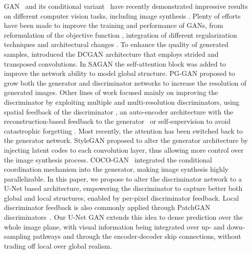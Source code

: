 \documentclass[10pt,twocolumn,letterpaper]{article}
\makeatletter
\renewcommand{\paragraph}{\@startsection{paragraph}{4}{\z@}{0.5ex plus 0.8ex minus .5ex}{-0.5em}{\normalsize\bf}}
\let\originalparagraph\paragraph
\renewcommand{\paragraph}[2][.]{\originalparagraph{#2#1}}
\makeatother
\begin{document}
\paragraph{Generative adversarial networks}

GAN~\cite{goodfellow2014generative} and its conditional variant~\cite{Mirza2014ConditionalGA} have recently demonstrated impressive results on different computer vision tasks, including image synthesis \cite{Radford2016UnsupervisedRL,Zhang_SAGAN19,karras2018progressive, Brock2019, Karras2018ASG, Lin2019COCOGANGB,Dey2018RankGANAM}. Plenty of efforts have been made to improve the training and performance of GANs, from reformulation of the objective function \cite{MaoLXLW16,Arjovsky2017WGAN,Lim2017GeometricG,Nowozin2016fGANTG}, integration of different regularization techniques \cite{Zhang2019ConsistencyRF,miyato2018spectral,Roth_NeurIPS2017,Zhang2018PAGANIG} and architectural changes \cite{Radford2016UnsupervisedRL,karras2018progressive,Durugkar2016GenerativeMN,Lin2019COCOGANGB}.
To enhance the quality of generated samples, \cite{Radford2016UnsupervisedRL} introduced the DCGAN architecture that employs strided and transposed convolutions. In SAGAN \cite{Zhang_SAGAN19} the self-attention block was added to improve the network ability to model global structure. PG-GAN \cite{karras2018progressive} proposed to grow both the generator and discriminator networks to increase the resolution of generated images. Other lines of work focused mainly on improving the discriminator by exploiting multiple \cite{Mordido2018DropoutGANLF, Durugkar2016GenerativeMN, Doan2018OnlineAC} and multi-resolution \cite{Wang2017HighResolutionIS,Sharma2018ImprovedTW} discriminators, using spatial feedback of the discriminator \cite{Huh2019FeedbackAL}, an auto-encoder architecture with the reconstruction-based feedback to the generator~\cite{zhao2016energy} or self-supervision to avoid catastrophic forgetting \cite{ChenSS2019}. 
Most recently, the attention has been switched back to the generator network. StyleGAN \cite{Karras2018ASG} proposed to alter the generator architecture by injecting latent codes to each convolution layer, thus allowing more control over the image synthesis process. COCO-GAN~\cite{Lin2019COCOGANGB} integrated the conditional coordination mechanism into the generator, making image synthesis highly parallelizable. 
In this paper, we propose to alter the discriminator network to a U-Net based architecture, empowering the discriminator to capture better both global and local structures, enabled by per-pixel discriminator feedback. 
Local discriminator feedback is also commonly applied through PatchGAN discriminators~\cite{isola2017image}. Our U-Net GAN extends this idea to dense prediction over the whole image plane, with visual information being integrated over up- and down-sampling pathways and through the encoder-decoder skip connections, without trading off local over global realism.
\end{document}
